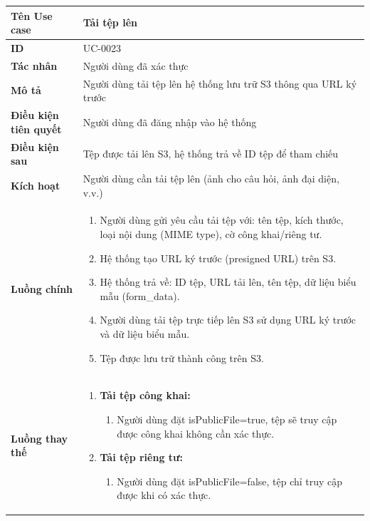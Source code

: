 {
\small
\renewcommand{\arraystretch}{1.15}

\begin{tabularx}{\textwidth}{|>{\raggedright\arraybackslash}p{3.5cm}|>{\raggedright\arraybackslash}X|}
\hline
\textbf{Tên Use case} & Tải tệp lên \\
\hline
\textbf{ID} & UC-0023 \\
\hline
\textbf{Tác nhân} & Người dùng đã xác thực \\
\hline
\textbf{Mô tả} & Người dùng tải tệp lên hệ thống lưu trữ S3 thông qua URL ký trước \\
\hline
\textbf{Điều kiện tiên quyết} & Người dùng đã đăng nhập vào hệ thống \\
\hline
\textbf{Điều kiện sau} & Tệp được tải lên S3, hệ thống trả về ID tệp để tham chiếu \\
\hline
\textbf{Kích hoạt} & Người dùng cần tải tệp lên (ảnh cho câu hỏi, ảnh đại diện, v.v.) \\
\hline
\textbf{Luồng chính} &
\begin{enumerate}
    \item Người dùng gửi yêu cầu tải tệp với: tên tệp, kích thước, loại nội dung (MIME type), cờ công khai/riêng tư.
    \item Hệ thống tạo URL ký trước (presigned URL) trên S3.
    \item Hệ thống trả về: ID tệp, URL tải lên, tên tệp, dữ liệu biểu mẫu (form\_data).
    \item Người dùng tải tệp trực tiếp lên S3 sử dụng URL ký trước và dữ liệu biểu mẫu.
    \item Tệp được lưu trữ thành công trên S3.
\end{enumerate} \\
\hline
\textbf{Luồng thay thế} &
\begin{enumerate}
    \item \textbf{Tải tệp công khai:}
    \begin{enumerate}
        \item[1A.] Người dùng đặt isPublicFile=true, tệp sẽ truy cập được công khai không cần xác thực.
    \end{enumerate}
    \item \textbf{Tải tệp riêng tư:}
    \begin{enumerate}
        \item[1B.] Người dùng đặt isPublicFile=false, tệp chỉ truy cập được khi có xác thực.
    \end{enumerate}

\end{enumerate}
\end{tabularx}}
